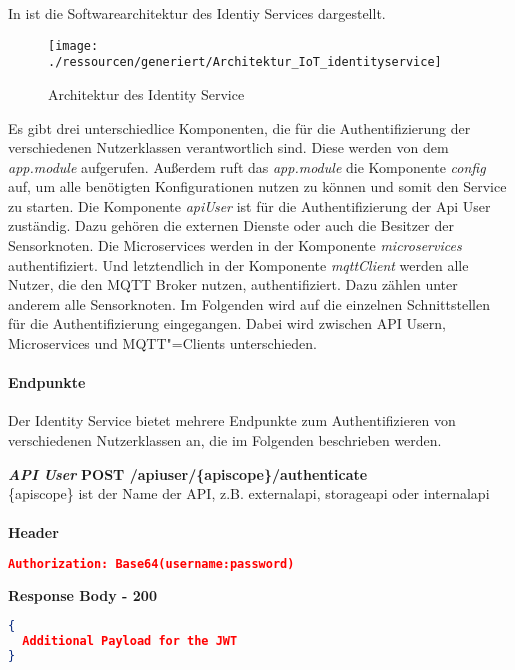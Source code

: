 In  ist die Softwarearchitektur des Identiy Services dargestellt.
\begin{figure}[!htb]
	\texttt{[image: ./ressourcen/generiert/Architektur\_IoT\_identityservice]}
	\caption{Architektur des Identity Service}
	\label{fig:architectureIdentityService}
\end{figure}
Es gibt drei unterschiedlice Komponenten, die für die Authentifizierung der verschiedenen Nutzerklassen verantwortlich sind.
Diese werden von dem \textit{app.module} aufgerufen.
Außerdem ruft das \textit{app.module} die Komponente \textit{config} auf, um alle benötigten Konfigurationen nutzen zu können und somit den Service zu starten.
Die Komponente \textit{apiUser} ist für die Authentifizierung der Api User zuständig.
Dazu gehören die externen Dienste oder auch die Besitzer der Sensorknoten.
Die Microservices werden in der Komponente \textit{microservices} authentifiziert.
Und letztendlich in der Komponente \textit{mqttClient} werden alle Nutzer, die den MQTT Broker nutzen, authentifiziert.
Dazu zählen unter anderem alle Sensorknoten.
\newline
\FloatBarrier
Im Folgenden wird auf die einzelnen Schnittstellen für die Authentifizierung eingegangen.
Dabei wird zwischen API Usern, Microservices und MQTT"=Clients unterschieden.

\paragraph{Endpunkte}
Der Identity Service bietet mehrere Endpunkte zum Authentifizieren von verschiedenen Nutzerklassen an, die im Folgenden beschrieben werden.
\newline

\textit{\textbf{API User}}
\newline
\textbf{POST /apiuser/\{apiscope\}/authenticate} 
\\\{apiscope\} ist der Name der API, z.B. externalapi, storageapi oder internalapi
\\\\
\textbf{Header}
\begin{lstlisting}[language=json,firstnumber=1,basicstyle=\footnotesize]
Authorization: Base64(username:password)
\end{lstlisting}

\textbf{Response Body - 200}
\begin{lstlisting}[language=json,firstnumber=1,basicstyle=\footnotesize]
{
  Additional Payload for the JWT
}
\end{lstlisting}

